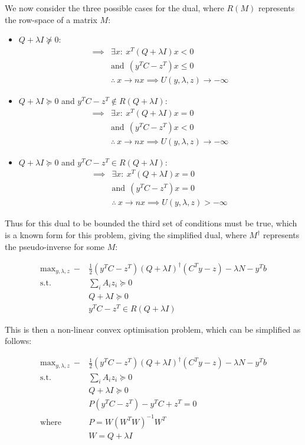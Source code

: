 \documentclass{article}
\begin{document}
We now consider the three possible cases for the dual, where $R(M)$ represents the row-space of a matrix $M$:

\begin{itemize}
\item $Q+\lambda I \not\succeq 0$:
	\begin{align}
		\implies &\exists x : ~ x^T (Q + \lambda I) x < 0 \\
				 &\text{and} ~~ (y^TC-z^T)x \le 0 \\
		&\therefore ~ x \to n x \implies U(y, \lambda, z) \to -\infty
	\end{align}
\item $Q+\lambda I \succeq 0$ and $y^TC-z^T \not \in R(Q+\lambda I)$:
	\begin{align}
		\implies &\exists x : ~ x^T (Q + \lambda I) x = 0 \\
				 &\text{and} ~~ (y^TC-z^T)x < 0 \\
		&\therefore ~ x \to n x \implies U(y, \lambda, z) \to -\infty
	\end{align}
\item $Q+\lambda I \succeq 0$ and $y^TC-z^T \in R(Q+\lambda I)$:
	\begin{align}
		\implies &\exists x : ~ x^T (Q + \lambda I) x = 0 \\
				 &\text{and} ~~ (y^TC-z^T)x = 0 \\
				 &\therefore ~ x \to n x \implies U(y, \lambda, z) > -\infty
	\end{align}
\end{itemize}

Thus for this dual to be bounded the third set of conditions must be true, which is a known form for this problem, giving the simplified dual, where $M^\dagger$ represents the pseudo-inverse for some $M$:

\begin{align}
	\text{max}_{y, \lambda, z} ~ -&\frac{1}{2} (y^T C - z^T) (Q+\lambda I)^\dagger (C^Ty - z) - \lambda N - y^T b \\ 
	\text{s.t.} ~~ &\sum_i A_i z_i \succeq 0 \\
				&Q+ \lambda I \succeq 0 \\
				&y^TC-z^T \in R(Q+\lambda I)
\end{align}

\pagebreak 

This is then a non-linear convex optimisation problem, which can be simplified as follows:

\begin{align}
	\text{max}_{y, \lambda, z} ~ -&\frac{1}{2} (y^T C - z^T) (Q+\lambda I)^\dagger (C^Ty - z) - \lambda N - y^T b \\ 
	\text{s.t.} ~~ &\sum_i A_i z_i \succeq 0 \\
				&Q+ \lambda I \succeq 0 \\
			    &P(y^TC-z^T)-y^T C+z^T = 0 \\ 
				\text{where} ~~ &P = W (W^T W)^{-1} W^T \\
								&W = Q+\lambda I
\end{align}
\end{document}
